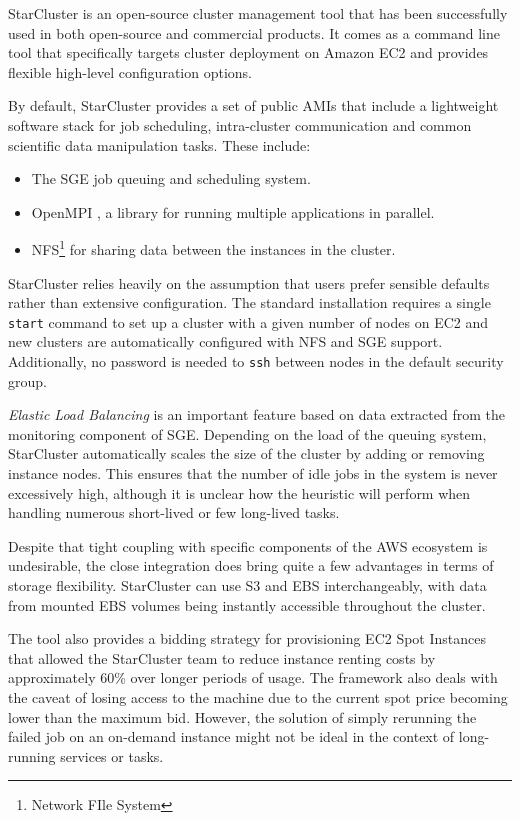 StarCluster \cite{StarCluster} is an open-source cluster management tool that has been successfully used in both open-source and commercial products. It comes as a command line tool that specifically targets cluster deployment on Amazon EC2 and provides flexible high-level configuration options.

By default, StarCluster provides a set of public AMIs that include a lightweight software stack for job scheduling, intra-cluster communication and common scientific data manipulation tasks. These include:
\begin{itemize}
	\item The SGE job queuing and scheduling system.
	\item OpenMPI \cite{OpenMPI}, a library for running multiple applications in parallel.
	\item NFS\footnote{Network FIle System} \cite{NFS} for sharing data between the instances in the cluster.
\end{itemize}

StarCluster relies heavily on the assumption that users prefer sensible defaults rather than extensive configuration. The standard installation requires a single \verb|start| command to set up a cluster with a given number of nodes on EC2 and new clusters are automatically configured with NFS and SGE support. Additionally, no password is needed to \verb|ssh| between nodes in the default security group.

\textit{Elastic Load Balancing} is an important feature based on data extracted from the monitoring component of SGE. Depending on the load of the queuing system, StarCluster automatically scales the size of the cluster by adding or removing instance nodes. This ensures that the number of idle jobs in the system is never excessively high, although it is unclear how the heuristic will perform when handling numerous short-lived or few long-lived tasks.

Despite that tight coupling with specific components of the AWS ecosystem is undesirable, the close integration does bring quite a few advantages in terms of storage flexibility. StarCluster can use S3 and EBS interchangeably, with data from mounted EBS volumes being instantly accessible throughout the cluster.

The tool also provides a bidding strategy for provisioning EC2 Spot Instances that allowed the StarCluster team to reduce instance renting costs by approximately 60\% over longer periods of usage. The framework also deals with the caveat of losing access to the machine due to the current spot price becoming lower than the maximum bid. However, the solution of simply rerunning the failed job on an on-demand instance might not be ideal in the context of long-running services or tasks.


